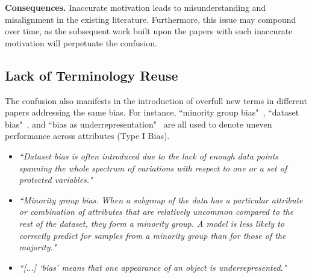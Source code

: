 \noindent
\textbf{Consequences.}
Inaccurate motivation leads to misunderstanding and misalignment in the existing literature. 
Furthermore, this issue may compound over time, as the subsequent work built upon the papers with such inaccurate motivation will perpetuate the confusion.











\subsection{Lack of Terminology Reuse}
The confusion also manifests in the introduction of overfull new terms in different papers addressing the same bias.
For instance, ``minority group bias"~\cite{minority_group_vs_sensitive_attribute}, ``dataset bias"~\cite{BR_Net_dataset_vs_task}, and ``bias as underrepresentation"~\cite{spurious_correlation_Underrepresentation} are all used to denote uneven performance across attributes (Type I Bias).
\begin{itemize}
    \item \emph{``Dataset bias is often introduced due to the lack of enough data points spanning the whole spectrum of variations with respect to one or a set of protected variables."}~\cite{BR_Net_dataset_vs_task}
    \item \emph{``Minority group bias. When a subgroup of the data has a particular attribute or combination of attributes that are relatively uncommon compared to the rest of the dataset, they form a minority group. A model is less likely to correctly predict for samples from a minority group than for those of the majority."}~\cite{minority_group_vs_sensitive_attribute}
    \item \emph{``[...] `bias' means that one appearance of an object is underrepresented."}~\cite{spurious_correlation_Underrepresentation}
\end{itemize}

